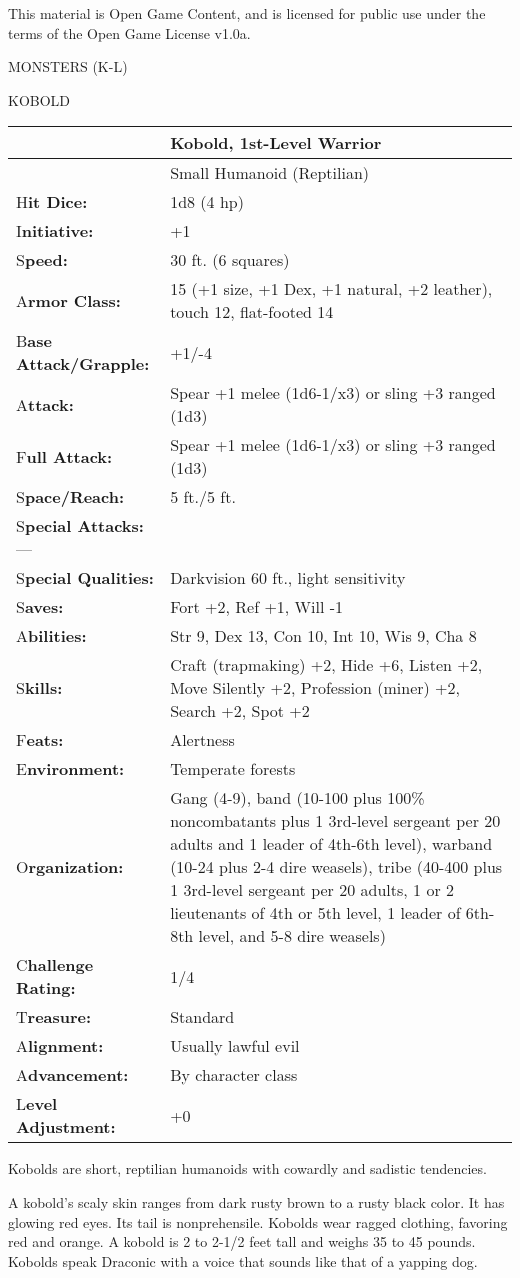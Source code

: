 \documentclass{article}
\begin{document}
This material is Open Game Content, and is licensed for public use under the terms 
of the Open Game License v1.0a.

{\LARGE{}MONSTERS (K-L)}

\vspace{12pt}
{\LARGE{}KOBOLD}

\begin{tabular}{|>{\raggedright}p{80pt}|>{\raggedright}p{245pt}|}
\hline
  & K\textbf{obold, 1st-Level Warrior}\tabularnewline
\hline
  & Small Humanoid (Reptilian)\tabularnewline
\hline
H\textbf{it Dice:} & 1d8 (4 hp)\tabularnewline
\hline
I\textbf{nitiative:} & +1\tabularnewline
\hline
S\textbf{peed:} & 30 ft. (6 squares)\tabularnewline
\hline
A\textbf{rmor Class:} & 15 (+1 size, +1 Dex, +1 natural, +2 leather), touch 12, 
flat-footed 14\tabularnewline
\hline
B\textbf{ase Attack/Grapple:} & +1/-4\tabularnewline
\hline
A\textbf{ttack:} & Spear +1 melee (1d6-1/x3) or sling +3 ranged (1d3)\tabularnewline
\hline
F\textbf{ull Attack:} & Spear +1 melee (1d6-1/x3) or sling +3 ranged (1d3)\tabularnewline
\hline
S\textbf{pace/Reach:} & 5 ft./5 ft.\tabularnewline
\hline
S\textbf{pecial Attacks:}--- & \tabularnewline
\hline
S\textbf{pecial Qualities:} & Darkvision 60 ft., light sensitivity\tabularnewline
\hline
S\textbf{aves:} & Fort +2, Ref +1, Will -1\tabularnewline
\hline
A\textbf{bilities:} & Str 9, Dex 13, Con 10, Int 10, Wis 9, Cha 8\tabularnewline
\hline
S\textbf{kills:} & Craft (trapmaking) +2, Hide +6, Listen +2, Move Silently +2, 
Profession (miner) +2, Search +2, Spot +2\tabularnewline
\hline
F\textbf{eats:} & Alertness\tabularnewline
\hline
E\textbf{nvironment:} & Temperate forests\tabularnewline
\hline
O\textbf{rganization:} & Gang (4-9), band (10-100 plus 100\% noncombatants plus 
1 3rd-level sergeant per 20 adults and 1 leader of 4th-6th level), warband (10-24 
plus 2-4 dire weasels), tribe (40-400 plus 1 3rd-level sergeant per 20 adults, 
1 or 2 lieutenants of 4th or 5th level, 1 leader of 6th-8th level, and 5-8 dire 
weasels)\tabularnewline
\hline
C\textbf{hallenge Rating:} & 1/4\tabularnewline
\hline
T\textbf{reasure:} & Standard\tabularnewline
\hline
A\textbf{lignment:} & Usually lawful evil\tabularnewline
\hline
A\textbf{dvancement:} & By character class\tabularnewline
\hline
L\textbf{evel Adjustment:} & +0\tabularnewline
\hline
\end{tabular}

Kobolds are short, reptilian humanoids with cowardly and sadistic tendencies.

A kobold's scaly skin ranges from dark rusty brown to a rusty black color. It has 
glowing red eyes. Its tail is nonprehensile. Kobolds wear ragged clothing, favoring 
red and orange. A kobold is 2 to 2-1/2 feet tall and weighs 35 to 45 pounds. Kobolds 
speak Draconic with a voice that sounds like that of a yapping dog.
\end{document}
